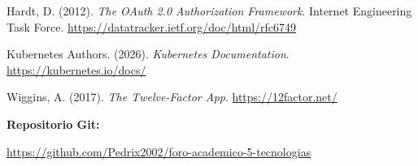 \documentclass[12pt,letterpaper]{article}
\begin{document}
\hangindent=1.27cm
Hardt, D. (2012).
\textit{The OAuth 2.0 Authorization Framework}.
Internet Engineering Task Force.
\url{https://datatracker.ietf.org/doc/html/rfc6749}

\vspace{0.5cm}

\hangindent=1.27cm
Kubernetes Authors. (2026).
\textit{Kubernetes Documentation}.
\url{https://kubernetes.io/docs/}

\vspace{0.5cm}

\hangindent=1.27cm
Wiggins, A. (2017).
\textit{The Twelve-Factor App}.
\url{https://12factor.net/}


\vspace{1cm}

\textbf{Repositorio Git:}

\noindent
\url{https://github.com/Pedrix2002/foro-academico-5-tecnologias}
\end{document}
